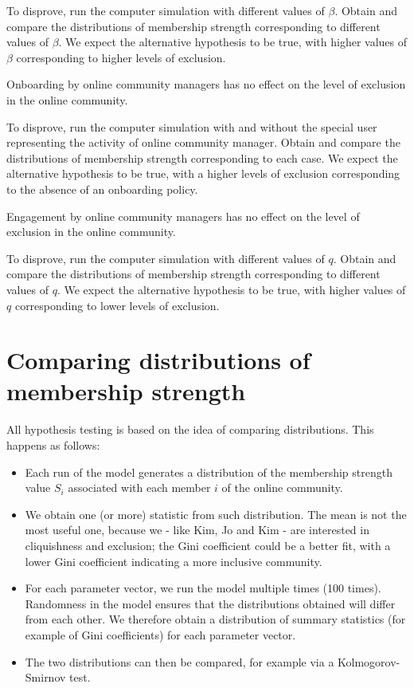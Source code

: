 \documentclass{article}
\begin{document}
To disprove, run the computer simulation with different values of $\beta$. Obtain and compare the distributions of membership strength corresponding to different values of $\beta$. We expect the alternative hypothesis to be true, with higher values of $\beta$ corresponding to higher levels of exclusion. 

\begin{intimacy}
	Onboarding by online community managers has no effect on the level of exclusion in the online community.
\end{intimacy}

To disprove, run the computer simulation with and without the special user representing the activity of online community manager. Obtain and compare the distributions of membership strength corresponding to each case. We expect the alternative hypothesis to be true, with a higher levels of exclusion corresponding to the absence of an onboarding policy. 

\begin{intimacy}
	Engagement by online community managers has no effect on the level of exclusion in the online community.
\end{intimacy}

To disprove,  run the computer simulation with different values of $q$. Obtain and compare the distributions of membership strength corresponding to different values of $q$. We expect the alternative hypothesis to be true, with higher values of $q$ corresponding to lower levels of exclusion. 

\section{Comparing distributions of membership strength}

All hypothesis testing is based on the idea of comparing distributions. This happens as follows:

\begin{itemize}
	\item Each run of the model generates a distribution of the membership strength value $S_i$ associated with each member $i$ of the online community. 
	\item We obtain one (or more) statistic from such distribution. The mean is not the most useful one, because we - like Kim, Jo and Kim - are interested in cliquishness and exclusion; the Gini coefficient could be a better fit, with a lower Gini coefficient indicating a more inclusive community.
	\item For each parameter vector, we run the model multiple times (100 times). Randomness in the model ensures that the distributions obtained will differ from each other. We therefore obtain a distribution of summary statistics (for example of Gini coefficients) for each parameter vector.
	\item The two distributions can then be compared, for example via a Kolmogorov-Smirnov test. 
\end{itemize}
\end{document}
